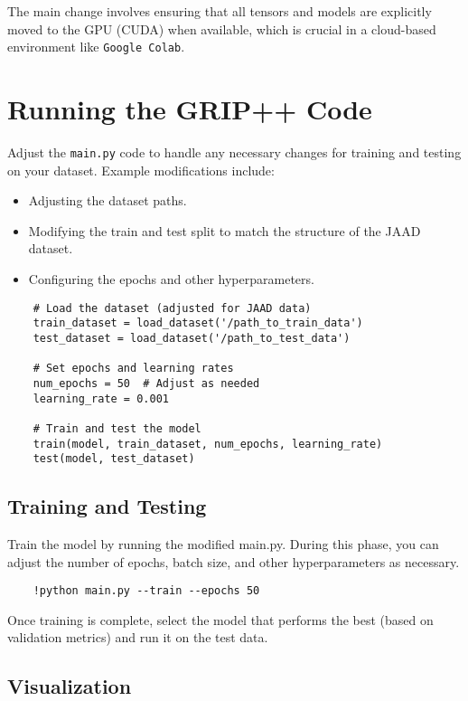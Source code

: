 The main change involves ensuring that all tensors and models are explicitly moved to the GPU (CUDA) when available, which is crucial in a cloud-based environment like \verb|Google Colab|.

\section{Running the GRIP++ Code}

Adjust the \verb|main.py| code to handle any necessary changes for training and testing on your dataset. Example modifications include:

\begin{itemize}
    \item Adjusting the dataset paths.
    \item Modifying the train and test split to match the structure of the JAAD dataset.
    \item Configuring the epochs and other hyperparameters.
\end{itemize}

\begin{verbatim}
    # Load the dataset (adjusted for JAAD data)
    train_dataset = load_dataset('/path_to_train_data')
    test_dataset = load_dataset('/path_to_test_data')
    
    # Set epochs and learning rates
    num_epochs = 50  # Adjust as needed
    learning_rate = 0.001
    
    # Train and test the model
    train(model, train_dataset, num_epochs, learning_rate)
    test(model, test_dataset)

\end{verbatim}

\subsection{Training and Testing}

Train the model by running the modified main.py. During this phase, you can adjust the number of epochs, batch size, and other hyperparameters as necessary.

\begin{verbatim}
    !python main.py --train --epochs 50
\end{verbatim}

Once training is complete, select the model that performs the best (based on validation metrics) and run it on the test data.

\subsection{Visualization}

